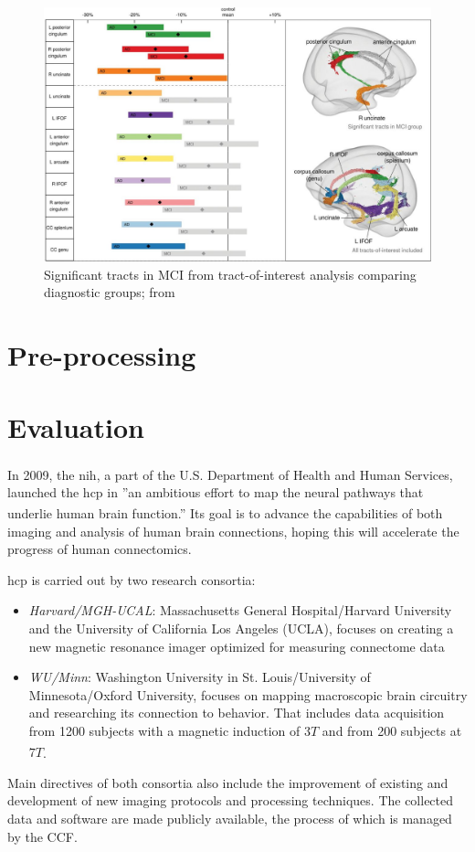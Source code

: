 \documentclass[plainreport]{cgvpub}
\newcommand{\newcite}[1]{\textsuperscript{\cite{#1}}}
\begin{document}
	\begin{figure}
		\includegraphics[width=\linewidth]{../pics/ad02}
		\caption[Significant tracts in MCI from tract-of-interest analysis comparing diagnostic groups]{Significant tracts in MCI from tract-of-interest analysis comparing diagnostic groups; from \cite{ad}}
		\label{fig:ad02}
	\end{figure}

	\chapter{Pre-processing} \label{ch:pp}
	
	\chapter{Evaluation}
	In 2009, the \acrfull{nih}, a part of the U.S. Department of Health and Human Services\newcite{nih_about}, launched the \acrfull{hcp} in ''an ambitious effort to map the neural pathways that underlie human brain function.''\newcite{nih_connectome} Its goal is to advance the capabilities of both imaging and analysis of human brain connections, hoping this will accelerate the progress of human connectomics. 
	
	\acrshort{hcp} is carried out by two research consortia:
	\begin{itemize}
		\item \emph{Harvard/MGH-UCAL}: Massachusetts General Hospital/Harvard University and the University of California Los Angeles (UCLA), focuses on creating a new magnetic resonance imager optimized for measuring connectome data
		\item \emph{WU/Minn}: Washington University in St. Louis/University of Minnesota/Oxford University, focuses on mapping macroscopic brain circuitry and researching its connection to behavior. That includes data acquisition from 1200 subjects with a magnetic induction of $ 3T $ and from 200 subjects at $ 7T $\newcite{wuminn}. 
	\end{itemize}
	Main directives of both consortia also include the improvement of existing and development of new imaging protocols and processing techniques. The collected data and software are made publicly available, the process of which is managed by the \Gls{CCF}. 
	
\end{document}
